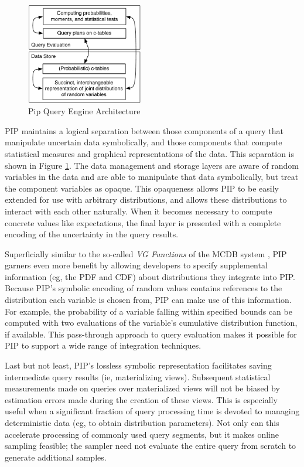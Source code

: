 %
\begin{figure}
\begin{center}
\includegraphics[width=2in]{graphics/arch.pdf}
\caption{Pip Query Engine Architecture}
\label{fig:arch}
\end{center}
\end{figure}

PIP maintains a logical separation between those components of a query that manipulate uncertain data symbolically, and those components that compute statistical measures and graphical representations of the data.  This separation is shown in Figure \ref{fig:arch}.  The data management and storage layers are aware of random variables in the data and are able to manipulate that data symbolically, but treat the component variables as opaque.  This opaqueness allows PIP to be easily extended for use with arbitrary distributions, and allows these distributions to interact with each other naturally.  When it becomes necessary to compute concrete values like expectations, the final layer is presented with a complete encoding of the uncertainty in the query results.  

Superficially similar to the so-called {\em VG Functions} of the MCDB system \cite{MCDB}, PIP garners even more benefit by allowing developers to specify supplemental information (eg, the PDF and CDF) about distributions they integrate into PIP.  Because PIP's symbolic encoding of random values contains references to the distribution each variable is chosen from, PIP can make use of this information.  For example, the probability of a variable falling within specified bounds can be computed with two evaluations of the variable's cumulative distribution function, if available.  This pass-through approach to query evaluation makes it possible for PIP to support a wide range of integration techniques.

Last but not least, PIP's lossless symbolic representation facilitates saving intermediate query results (ie, materializing views).  Subsequent statistical measurements made on queries over materialized views will not be biased by estimation errors made during the creation of these views.  This is especially useful when a significant fraction of query processing time is devoted to managing deterministic data (eg, to obtain distribution parameters).  Not only can this accelerate processing of commonly used query segments, but it makes online sampling feasible; the sampler need not evaluate the entire query from scratch to generate additional samples.

